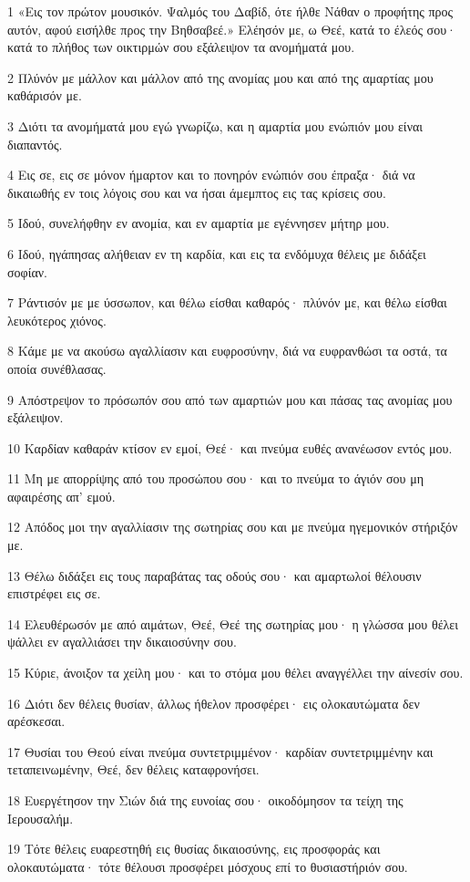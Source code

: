 \par 1 «Εις τον πρώτον μουσικόν. Ψαλμός του Δαβίδ, ότε ήλθε Νάθαν ο προφήτης προς αυτόν, αφού εισήλθε προς την Βηθσαβεέ.» Ελέησόν με, ω Θεέ, κατά το έλεός σου· κατά το πλήθος των οικτιρμών σου εξάλειψον τα ανομήματά μου.
\par 2 Πλύνόν με μάλλον και μάλλον από της ανομίας μου και από της αμαρτίας μου καθάρισόν με.
\par 3 Διότι τα ανομήματά μου εγώ γνωρίζω, και η αμαρτία μου ενώπιόν μου είναι διαπαντός.
\par 4 Εις σε, εις σε μόνον ήμαρτον και το πονηρόν ενώπιόν σου έπραξα· διά να δικαιωθής εν τοις λόγοις σου και να ήσαι άμεμπτος εις τας κρίσεις σου.
\par 5 Ιδού, συνελήφθην εν ανομία, και εν αμαρτία με εγέννησεν μήτηρ μου.
\par 6 Ιδού, ηγάπησας αλήθειαν εν τη καρδία, και εις τα ενδόμυχα θέλεις με διδάξει σοφίαν.
\par 7 Ράντισόν με με ύσσωπον, και θέλω είσθαι καθαρός· πλύνόν με, και θέλω είσθαι λευκότερος χιόνος.
\par 8 Κάμε με να ακούσω αγαλλίασιν και ευφροσύνην, διά να ευφρανθώσι τα οστά, τα οποία συνέθλασας.
\par 9 Απόστρεψον το πρόσωπόν σου από των αμαρτιών μου και πάσας τας ανομίας μου εξάλειψον.
\par 10 Καρδίαν καθαράν κτίσον εν εμοί, Θεέ· και πνεύμα ευθές ανανέωσον εντός μου.
\par 11 Μη με απορρίψης από του προσώπου σου· και το πνεύμα το άγιόν σου μη αφαιρέσης απ' εμού.
\par 12 Απόδος μοι την αγαλλίασιν της σωτηρίας σου και με πνεύμα ηγεμονικόν στήριξόν με.
\par 13 Θέλω διδάξει εις τους παραβάτας τας οδούς σου· και αμαρτωλοί θέλουσιν επιστρέφει εις σε.
\par 14 Ελευθέρωσόν με από αιμάτων, Θεέ, Θεέ της σωτηρίας μου· η γλώσσα μου θέλει ψάλλει εν αγαλλιάσει την δικαιοσύνην σου.
\par 15 Κύριε, άνοιξον τα χείλη μου· και το στόμα μου θέλει αναγγέλλει την αίνεσίν σου.
\par 16 Διότι δεν θέλεις θυσίαν, άλλως ήθελον προσφέρει· εις ολοκαυτώματα δεν αρέσκεσαι.
\par 17 Θυσίαι του Θεού είναι πνεύμα συντετριμμένον· καρδίαν συντετριμμένην και τεταπεινωμένην, Θεέ, δεν θέλεις καταφρονήσει.
\par 18 Ευεργέτησον την Σιών διά της ευνοίας σου· οικοδόμησον τα τείχη της Ιερουσαλήμ.
\par 19 Τότε θέλεις ευαρεστηθή εις θυσίας δικαιοσύνης, εις προσφοράς και ολοκαυτώματα· τότε θέλουσι προσφέρει μόσχους επί το θυσιαστήριόν σου.

